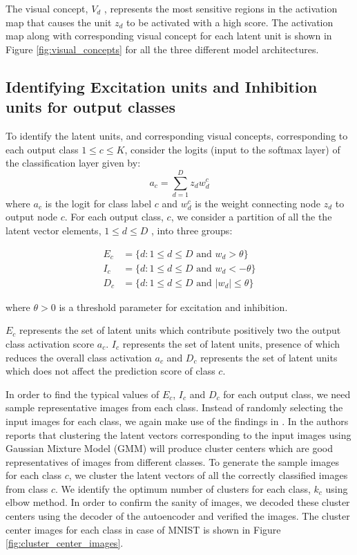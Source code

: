 \documentclass[pdflatex,referee,lineno]{sn-jnl}
\theoremstyle{thmstyleone}
\theoremstyle{thmstyletwo}
\theoremstyle{thmstylethree}
\begin{document}
The visual concept, $V_d$ , represents the most sensitive regions in the   activation map that causes the unit $z_d$ to be activated with a high score.  The activation map along with corresponding visual concept for each latent unit is shown in Figure \ref{fig:visual_concepts} for all the three different model architectures.


\subsection{Identifying Excitation units and Inhibition units for output classes }
To identify the  latent  units, and corresponding visual concepts,  corresponding to each output class $1\le c\le K$, consider the logits (input to the softmax layer) of the  classification layer given by:
\begin{equation}
    a_c = \sum_{d=1}^{D}z_dw_d^c
\end{equation}
where $a_c$ is the logit for class label $c$ and $w_d^c$ is the weight connecting node $z_d$ to output node $c$. For each output class, $c$, we consider a partition of all the  the latent vector elements, $1\le d \le D$ , into three groups:
\begin{fleqn}
\begin{align}
E_c &= \{d:1\le d\le D  \text{ and } w_d >\theta \} \\
I_c &= \{d:1\le d\le D  \text{ and } w_d <-\theta \}\\
 D_c &= \{d:1\le d\le D  \text{ and } |w_d| \le \theta \}
\end{align}
\end{fleqn}

where $\theta >0$ is a threshold parameter for excitation and inhibition.

$E_c$ represents the set of latent units   which contribute positively two the output class activation score $a_c$. $I_c$ represents the set of latent units, presence of which  reduces the overall class activation  $a_c$  and $D_c$  represents the set of latent units  which does not affect the prediction score of class  $c$. 

In order to find the typical values of $E_c$, $I_c$ and $D_c$  for each output class, we need sample representative images from each class. Instead of randomly selecting the input images for each class, we again make use of the findings in \cite{vengalil2021semi}  . In \cite{vengalil2021semi} the authors reports that clustering the latent vectors corresponding to the input images using Gaussian Mixture Model (GMM) will produce cluster centers which are good representatives of images from different classes.  To generate the sample images for each class $c$, we cluster the latent vectors of all the correctly classified  images from class $c$. We identify the optimum number of clusters for each class, $k_c$ using elbow method. In order to confirm the sanity of images, we decoded these cluster centers using the decoder of the autoencoder and verified the images. The cluster center images for each class in case of MNIST is shown in Figure \ref{fig:cluster_center_images}.
\end{document}
